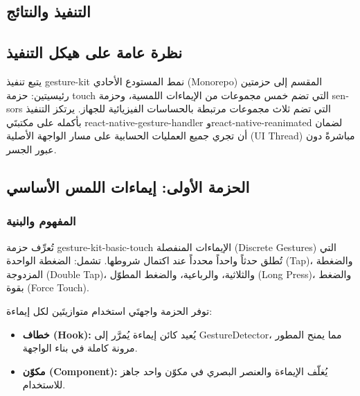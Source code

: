 \begin{Arabic}
\chapter{التنفيذ والنتائج}
\clearpage

\section{نظرة عامة على هيكل التنفيذ}

يتبع تنفيذ \textenglish{gesture-kit} نمط المستودع الأحادي (\textenglish{Monorepo}) المقسم إلى حزمتين رئيسيتين: حزمة \textenglish{touch} التي تضم خمس مجموعات من الإيماءات اللمسية، وحزمة \textenglish{sensors} التي تضم ثلاث مجموعات مرتبطة بالحساسات الفيزيائية للجهاز. يرتكز التنفيذ بأكمله على مكتبتَي \textenglish{react-native-gesture-handler} و\textenglish{react-native-reanimated} لضمان أن تجري جميع العمليات الحسابية على مسار الواجهة الأصلية (\textenglish{UI Thread}) مباشرةً دون عبور الجسر.

\section{الحزمة الأولى: إيماءات اللمس الأساسي}

\subsection{المفهوم والبنية}

تُعرِّف حزمة \textenglish{gesture-kit-basic-touch} الإيماءات المنفصلة (\textenglish{Discrete Gestures}) التي تُطلق حدثاً واحداً محدداً عند اكتمال شروطها. تشمل: الضغطة الواحدة (\textenglish{Tap})، والضغطة المزدوجة (\textenglish{Double Tap})، والثلاثية، والرباعية، والضغط المطوّل (\textenglish{Long Press})، والضغط بقوة (\textenglish{Force Touch}).

توفر الحزمة واجهتَي استخدام متوازيتَين لكل إيماءة:
\begin{itemize}
    \item \textbf{خطاف (\textenglish{Hook}):} يُعيد كائن إيماءة يُمرَّر إلى \textenglish{GestureDetector}، مما يمنح المطور مرونة كاملة في بناء الواجهة.
    \item \textbf{مكوّن (\textenglish{Component}):} يُغلّف الإيماءة والعنصر البصري في مكوّن واحد جاهز للاستخدام.
\end{itemize}


\end{Arabic}
